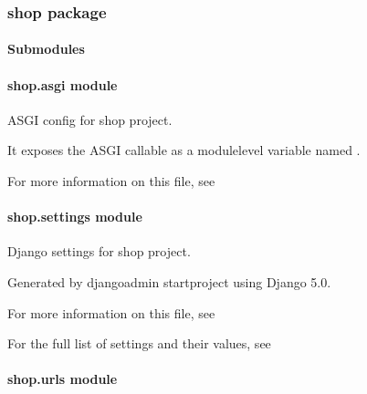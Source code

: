\documentclass[letterpaper,10pt,english]{sphinxmanual}
\begin{document}
\sphinxstepscope


\subsubsection{shop package}
\label{\detokenize{shop:shop-package}}\label{\detokenize{shop::doc}}

\paragraph{Submodules}
\label{\detokenize{shop:submodules}}

\paragraph{shop.asgi module}
\label{\detokenize{shop:module-shop.asgi}}\label{\detokenize{shop:shop-asgi-module}}
\sphinxAtStartPar
ASGI config for shop project.

\sphinxAtStartPar
It exposes the ASGI callable as a module\sphinxhyphen{}level variable named .

\sphinxAtStartPar
For more information on this file, see


\paragraph{shop.settings module}
\label{\detokenize{shop:module-shop.settings}}\label{\detokenize{shop:shop-settings-module}}
\sphinxAtStartPar
Django settings for shop project.

\sphinxAtStartPar
Generated by \textquotesingle{}django\sphinxhyphen{}admin startproject\textquotesingle{} using Django 5.0.

\sphinxAtStartPar
For more information on this file, see

\sphinxAtStartPar
For the full list of settings and their values, see


\paragraph{shop.urls module}
\label{\detokenize{shop:module-shop.urls}}\label{\detokenize{shop:shop-urls-module}}
\end{document}

